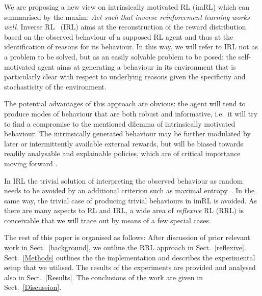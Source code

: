 \documentclass{article}
\begin{document}
We are proposing a new view on intrinsically motivated RL (imRL) which can summarised by the 
maxim: \emph{Act such that inverse reinforcement learning works well}. 
Inverse RL~\cite{ng2000algorithms} (IRL) aims at the reconstruction of the reward distribution based
on the observed behaviour of a supposed RL agent and thus at the identification of reasons 
for its behaviour. In this way, we will refer to IRL not as a problem to be solved, 
but as an easily solvable problem to be posed: 
the self-motivated agent aims at generating a behaviour in its environment that 
is particularly clear with respect to underlying reasons given the specificity and 
stochasticity of the environment. 

The potential advantages of this approach are obvious: the
agent will tend to produce modes of behaviour that are both robust and informative, i.e.~it
will try to find a compromise to the mentioned dilemma of intrinsically motivated behaviour.
The intrinsically generated behaviour may be further modulated by later or intermittently 
available external rewards, but will be biased towards readily analysable and explainable
policies, which are of critical importance moving forward \cite{leike2017ai, amodei2016concrete}. %

In IRL the trivial solution of interpreting the observed behaviour as random 
needs to be avoided by an additional criterion such as maximal entropy~\cite{ziebart2008maximum}. 
In the same way, the trivial case of producing trivial behaviours in imRL is avoided.
As there are many aspects to RL and IRL, a wide area of \emph{reflexive} RL (RRL) is 
conceivable that we will trace out by means of a few special cases.

The rest of this paper is organised as follows: After discussion of prior relevant work in Sect.~\ref{background}, we outline the RRL approach in Sect.~\ref{reflexive}. Sect.~\ref{Methods} outlines the the implementation and describes the experimental setup that we utilised. The results of the experiments are provided and analysed also in Sect.~\ref{Results}. The conclusions of the work are given in Sect.~\ref{Discussion}.
\end{document}
